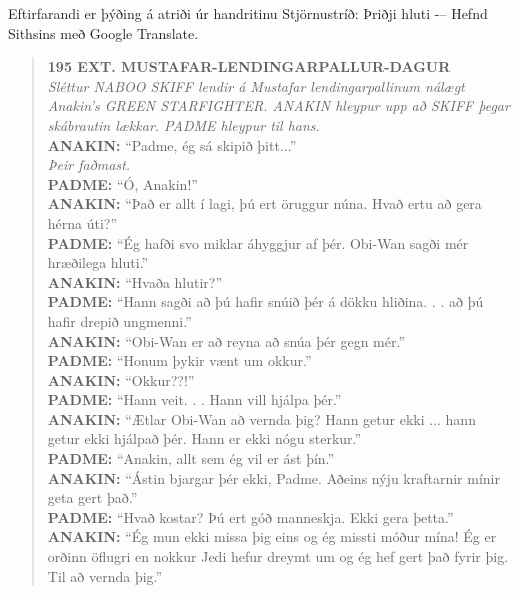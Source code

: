 
Eftirfarandi er þýðing á atriði úr handritinu Stjörnustríð: Þriðji hluti -– Hefnd Sithsins með Google Translate.

\begin{quote}
    \textbf{195 EXT. MUSTAFAR-LENDINGARPALLUR-DAGUR}\\
    \textit{Sléttur NABOO SKIFF lendir á Mustafar lendingarpallinum nálægt Anakin's GREEN STARFIGHTER. ANAKIN hleypur upp að SKIFF þegar skábrautin lækkar. PADME hleypur til hans.}\\
    \textbf{ANAKIN:} ``Padme, ég sá skipið þitt...''\\
    \textit{Þeir faðmast.}\\
    \textbf{PADME:} ``Ó, Anakin!''\\
    \textbf{ANAKIN:} ``Það er allt í lagi, þú ert öruggur núna. Hvað ertu að gera hérna úti?''\\
    \textbf{PADME:} ``Ég hafði svo miklar áhyggjur af þér. Obi-Wan sagði mér hræðilega hluti.''\\
    \textbf{ANAKIN:} ``Hvaða hlutir?''\\
    \textbf{PADME:} ``Hann sagði að þú hafir snúið þér á dökku hliðina. . . að þú hafir drepið ungmenni.''\\
    \textbf{ANAKIN:} ``Obi-Wan er að reyna að snúa þér gegn mér.''\\
    \textbf{PADME:} ``Honum þykir vænt um okkur.''\\
    \textbf{ANAKIN:} ``Okkur??!''\\
    \textbf{PADME:} ``Hann veit. . . Hann vill hjálpa þér.''\\
    \textbf{ANAKIN:} ``Ætlar Obi-Wan að vernda þig? Hann getur ekki ... hann getur ekki hjálpað þér. Hann er ekki nógu sterkur.''\\
    \textbf{PADME:} ``Anakin, allt sem ég vil er ást þín.''\\
    \textbf{ANAKIN:} ``Ástin bjargar þér ekki, Padme. Aðeins nýju kraftarnir mínir geta gert það.''\\
    \textbf{PADME:} ``Hvað kostar? Þú ert góð manneskja. Ekki gera þetta.''\\
    \textbf{ANAKIN:} ``Ég mun ekki missa þig eins og ég missti móður mína! Ég er orðinn öflugri en nokkur Jedi hefur dreymt um og ég hef gert það fyrir þig. Til að vernda þig.''\\

\end{quote}
